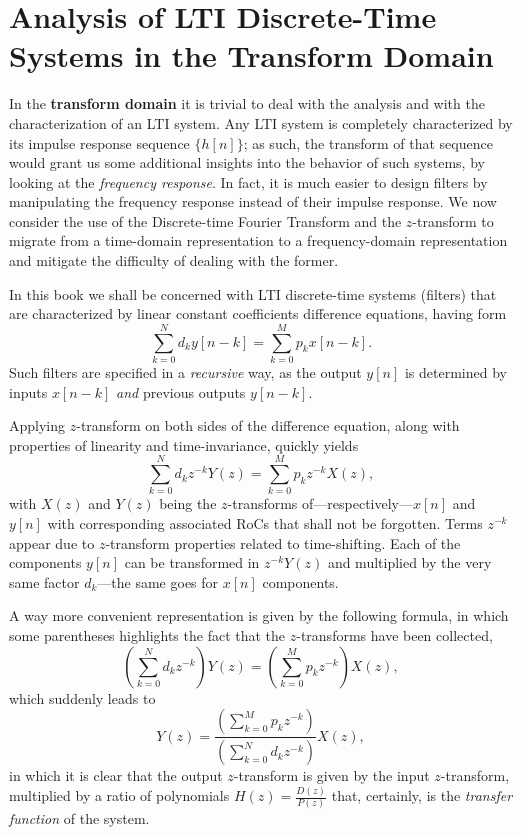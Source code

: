 \documentclass[\documentfontsize, twocolumn]{\classname}
\begin{document}
\chapter{Analysis of LTI Discrete-Time Systems in the Transform Domain}

In the \textbf{transform domain} it is trivial to deal with the analysis and with the characterization of an LTI system. Any LTI system is completely characterized by its impulse response sequence $\{h[n]\}$; as such, the transform of that sequence would grant us some additional insights into the behavior of such systems, by looking at the \emph{frequency response}. In fact, it is much easier to design filters by manipulating the frequency response instead of their impulse response. We now consider the use of the Discrete-time Fourier Transform and the $z$-transform to migrate from a time-domain representation to a frequency-domain representation and mitigate the difficulty of dealing with the former.

In this book we shall be concerned with LTI discrete-time systems (filters) that are characterized by linear constant coefficients difference equations, having form
\begin{equation}\label{eqn:ltiDiscreteTimeLinearConstantCoefficientsDifference}
    \sum_{k=0}^N d_k y[n-k] = \sum_{k=0}^M p_k x[n-k].
\end{equation}
Such filters are specified in a \emph{recursive} way, as the output $y[n]$ is determined by inputs $x[n - k]$ \emph{and} previous outputs $y[n-k]$.

Applying $z$-transform on both sides of the difference equation, along with properties of linearity and time-invariance, quickly yields
\begin{equation}\label{eqn:zTransformLtiDiscreteTimeLinearConstantCoefficientsDifference}
    \sum_{k=0}^N d_k z^{-k} Y(z) = \sum_{k=0}^M p_k z^{-k} X(z),
\end{equation}
with $X(z)$ and $Y(z)$ being the $z$-transforms of---respectively---$x[n]$ and $y[n]$ with corresponding associated RoCs that shall not be forgotten. Terms $z^{-k}$ appear due to $z$-transform properties related to time-shifting. Each of the components $y[n]$ can be transformed in $z^{-k}Y(z)$ and multiplied by the very same factor $d_k$---the same goes for $x[n]$ components.

A way more convenient representation is given by the following formula, in which some parentheses highlights the fact that the $z$-transforms have been collected,
\[
    \left(\sum_{k=0}^N d_k z^{-k}\right) Y(z) = \left(\sum_{k=0}^M p_k z^{-k}\right) X(z),
\]
which suddenly leads to
\begin{equation}\label{eqn:zTransformLtiDiscreteTimeLinearConstantCoefficientsDifferenceAlternate}
    Y(z) = \frac {
        \left(\sum_{k=0}^M p_k z^{-k}\right)
    } {
        \left(\sum_{k=0}^N d_k z^{-k}\right)
    } X(z),
\end{equation}
in which it is clear that the output $z$-transform is given by the input $z$-transform, multiplied by a ratio of polynomials $H(z) = \frac{D(z)}{P(z)}$ that, certainly, is the \emph{transfer function} of the system.
\end{document}
